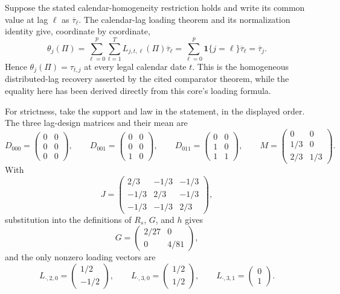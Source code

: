 Suppose the stated calendar-homogeneity restriction holds and write its common value at lag \(\ell\) as \(\overline\tau_{\ell}\).  The calendar-lag loading theorem and its normalization identity give, coordinate by coordinate,
\[
 \theta_j(\Pi)
 =\sum_{\ell=0}^p\sum_{t=1}^TL_{j,t,\ell}(\Pi)\overline\tau_{\ell}
 =\sum_{\ell=0}^p\mathbf 1\{j=\ell\}\overline\tau_{\ell}
 =\overline\tau_j.
\]
Hence \(\theta_j(\Pi)=\tau_{t,j}\) at every legal calendar date \(t\).  This is the homogeneous distributed-lag recovery asserted by the cited comparator theorem, while the equality here has been derived directly from this core's loading formula.

For strictness, take the support and law in the statement, in the displayed order.  The three lag-design matrices and their mean are
\[
 D_{000}=\begin{pmatrix}0&0\\0&0\\0&0\end{pmatrix},\qquad
 D_{001}=\begin{pmatrix}0&0\\0&0\\1&0\end{pmatrix},\qquad
 D_{011}=\begin{pmatrix}0&0\\1&0\\1&1\end{pmatrix},\qquad
 M=\begin{pmatrix}0&0\\1/3&0\\2/3&1/3\end{pmatrix}.
\]
With
\[
 J=\begin{pmatrix}2/3&-1/3&-1/3\\-1/3&2/3&-1/3\\-1/3&-1/3&2/3\end{pmatrix},
\]
substitution into the definitions of \(R_s\), \(G\), and \(h\) gives
\[
 G=\begin{pmatrix}2/27&0\\0&4/81\end{pmatrix},
\]
and the only nonzero loading vectors are
\[
 L_{\cdot,2,0}=\begin{pmatrix}1/2\\-1/2\end{pmatrix},\qquad
 L_{\cdot,3,0}=\begin{pmatrix}1/2\\1/2\end{pmatrix},\qquad
 L_{\cdot,3,1}=\begin{pmatrix}0\\1\end{pmatrix}.
\]
